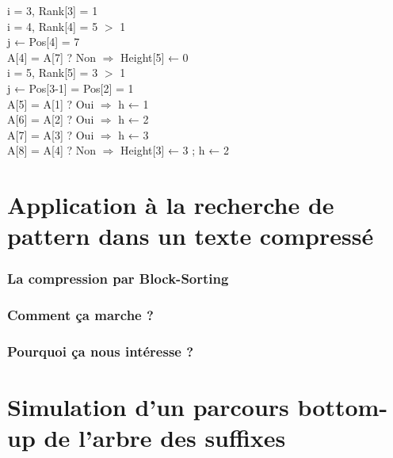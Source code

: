 \documentclass[10pt]{beamer}
\begin{document}
\begin{frame}
\begin{multicols}{2}
  \pause
  i = 3, Rank[3] = 1\\
  \pause
  i = 4, Rank[4] = 5 $>$ 1\\
         j ← Pos[4] = 7\\
           A[4] = A[7] ? Non $\Rightarrow$ Height[5] ← 0\\
  \pause
  i = 5, Rank[5] = 3 $>$ 1\\
         j ← Pos[3-1] = Pos[2] = 1\\
           A[5] = A[1] ? Oui $\Rightarrow$ h ← 1\\
           A[6] = A[2] ? Oui $\Rightarrow$ h ← 2\\
           A[7] = A[3] ? Oui $\Rightarrow$ h ← 3\\
           A[8] = A[4] ? Non $\Rightarrow$ Height[3] ← 3 ; h ← 2\\

  \end{multicols}
  \normalsize
\end{frame}


\section{Application à la recherche de pattern dans un texte compressé}
\label{sec:appcompress}

\begin{frame}
  \frametitle{La compression par Block-Sorting}
\end{frame}

\begin{frame}
  \frametitle{Comment ça marche ?}
\end{frame}

\begin{frame}
  \frametitle{Pourquoi ça nous intéresse ?}
\end{frame}



\section{Simulation d'un parcours bottom-up de l'arbre des suffixes}
\label{sec:appbottomup}
\end{document}
